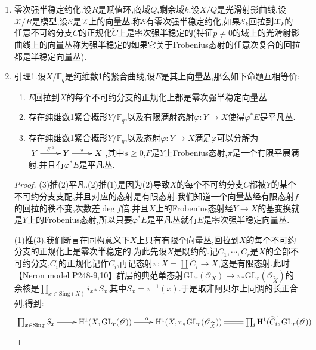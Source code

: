 \begin{enumerate}
\begin{proof}
    	就有$\rho^*_{v/e}\Omega=\rho^*_{v/e}\pi^*_{v/e}\mathcal{E}_{v/e}$是平凡挠子.
    \end{proof}
    \item 零次强半稳定约化.设$R$是赋值环,商域$Q$,剩余域$k$.设$X/Q$是光滑射影曲线,设$\mathcal{X}/R$是模型,设$\mathcal{E}$是$\mathcal{X}$上的向量丛.称$\mathcal{E}$有零次强半稳定约化,如果$\mathcal{E}_k$回拉到$\mathcal{X}_k$的任意不可约分支$C$的正规化$\widetilde{C}$上是零次强半稳定的(特征$p\not=0$的域上的光滑射影曲线上的向量丛称为强半稳定的如果它关于Frobenius态射的任意次复合的回拉都是半稳定向量丛).
    \item 引理1.设$X/\mathbb{F}_q$是纯维数1的紧合曲线,设$E$是其上向量丛,那么如下命题互相等价:
    \begin{enumerate}[(1)]
    	\item $E$回拉到$X$的每个不可约分支的正规化上都是零次强半稳定向量丛.
    	\item 存在纯维数1紧合概形$Y/\mathbb{F}_q$,以及有限满射态射$\varphi:Y\to X$使得$\varphi^*E$是平凡丛.
    	\item 存在纯维数1紧合概形$Y/\mathbb{F}_q$,以及态射$\varphi:Y\to X$满足$\varphi$可以分解为$\xymatrix{Y\ar[r]^{F^s}&Y\ar[r]^{\pi}&X}$,其中$s\ge0$,$F$是$Y$上Frobenius态射,$\pi$是一个有限平展满射.并且有$\varphi^*E$是平凡丛.
    \end{enumerate}
    \begin{proof}
    	
    	(3)推(2)平凡.(2)推(1)是因为(2)导致$X$的每个不可约分支$C$都被$Y$的某个不可约分支支配,并且对应的态射是有限态射.我们知道一个向量丛经有限态射$f$的回拉的秩不变,次数差$\deg f$倍,并且$X$上的Frobenius态射经$Y\to X$的基变换就是$Y$上的Frobenius态射,所以只要$\varphi^*E$是平凡丛就有$E$是零次强半稳定向量丛.
    	
    	\qquad
    	
    	(1)推(3).我们断言在同构意义下$X$上只有有限个向量丛,回拉到$X$的每个不可约分支的正规化上是零次半稳定的.为此先设$X$是既约的.记$C_1,\cdots,C_r$是$X$的全部不可约分支,$C_i$的正规化记作$\widetilde{C_i}$,再记态射$\pi:\widetilde{X}=\coprod\widetilde{C_i}\to X$,这是有限态射.此时【Neron model P248-9,10】群层的典范单态射$\mathrm{GL}_r(\mathscr{O}_X)\to\pi_*\mathrm{GL}_r(\mathscr{O}_{\widetilde{X}})$的余核是$\prod_{x\in\mathrm{Sing}(X)}i_{x*}S_x$,其中$S_x=\pi^{-1}(x)$.于是取非阿贝尔上同调的长正合列,得到:
    	$$\xymatrix{\prod_{x\in\mathrm{Sing}}S_x\ar[r]&\mathrm{H}^1(X,\mathrm{GL}_r(\mathscr{O}))\ar[r]^{\alpha}&\mathrm{H}^1(X,\pi_*\mathrm{GL}_r(\mathscr{O}_{\widetilde{X}}))\ar@{=}[r]&\prod_i\mathrm{H}^1(\widetilde{C_i},\mathrm{GL}_r(\mathscr{O}))}$$
    	

\end{proof}
\end{enumerate}
